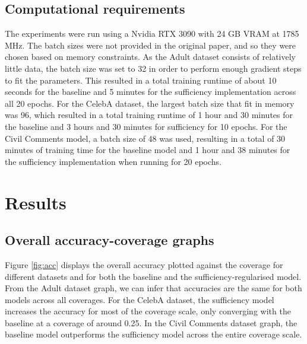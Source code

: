 \subsection{Computational requirements}

The experiments were run using a Nvidia RTX 3090 with 24 GB VRAM at 1785 MHz. The batch sizes were not provided in the original paper, and so they were chosen based on memory constraints. As the Adult dataset consists of relatively little data, the batch size was set to 32 in order to perform enough gradient steps to fit the parameters. This resulted in a total training runtime of about 10 seconds for the baseline and 5 minutes for the sufficiency implementation across all 20 epochs. For the CelebA dataset, the largest batch size that fit in memory was 96, which resulted in a total training runtime of 1 hour and 30 minutes for the baseline and 3 hours and 30 minutes for sufficiency for 10 epochs. For the Civil Comments model, a batch size of 48 was used, resulting in a total of 30 minutes of training time for the baseline model and 1 hour and 38 minutes for the sufficiency implementation when running for 20 epochs.


\section{Results}
\label{sec:results}

\subsection{Overall accuracy-coverage graphs}
Figure \ref{fig:acc} displays the overall accuracy plotted against the coverage for different datasets and for both the baseline and the sufficiency-regularised model. From the Adult dataset graph, we can infer that accuracies are the same for both models across all coverages.
For the CelebA dataset, the sufficiency model increases the accuracy for most of the coverage scale, only converging with the baseline at a coverage of around 0.25. In the Civil Comments dataset graph, the baseline model outperforms the sufficiency model across the entire coverage scale.

